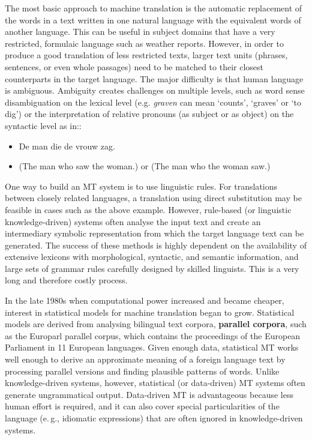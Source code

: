 \documentclass[]{../../metanetpaper}
\begin{document}
\begin{multicols}{2}

The most basic approach to machine translation is the automatic replacement of the words in a text written in one natural language with the equivalent words of another language. This can be useful in subject domains that have a very restricted, formulaic language such as weather reports.
However, in order to produce a good translation of less restricted texts, larger text units (phrases, sentences, or even whole passages) need to be matched to their closest counterparts in the target language. The major difficulty is that human language is ambiguous. Ambiguity creates challenges on multiple levels, such as word sense disambiguation on the lexical level (e.g. \emph{graven} can mean `counts',  `graves' or `to dig')  or the interpretation of relative pronouns (as subject or as object) on the syntactic level as in::

\begin{itemize}
\item De man die de vrouw zag.
\item (The man who saw the woman.) or (The man who the woman saw.)
\end{itemize}

One way to build an MT system is to use linguistic rules. For translations between closely related languages, a translation using direct substitution may be feasible in cases such as the above example. However, rule-based (or linguistic knowledge-driven) systems often analyse the input text and create an intermediary symbolic representation from which the target language text can be generated. The success of these methods is highly dependent on the availability of extensive lexicons with morphological, syntactic, and semantic information, and large sets of grammar rules carefully designed by skilled linguists. This is a very long and therefore costly process.

In the late 1980s when computational power increased and became cheaper, interest in statistical models for machine translation began to grow. Statistical models are derived from analysing bilingual text corpora, \textbf{parallel corpora}, such as the Europarl parallel corpus, which contains the proceedings of the European Parliament in 11 European languages. Given enough data, statistical MT works well enough to derive an approximate meaning of a foreign language text by processing parallel versions and finding plausible patterns of words. Unlike knowledge-driven systems, however, statistical (or data-driven) MT systems often generate ungrammatical output. Data-driven MT is advantageous because less human effort is required, and it can also cover special particularities of the language (e.\,g., idiomatic expressions) that are often ignored in knowledge-driven systems. 


\end{multicols}
\end{document}
